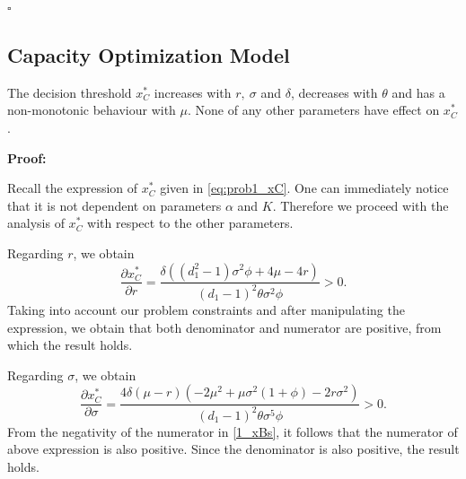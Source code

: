  
\begin{flushright}
 $\square$
\end{flushright}


\subsection{Capacity Optimization Model}

\begin{prop}
	\label{1_prop2}
The decision threshold $x^*_C$ increases with $r, \ \sigma$ and $\delta$, decreases with $\theta$ and has a non-monotonic behaviour with  $\mu$. None of any other parameters have effect on $x^*_C$.
\end{prop}

\textbf{Proof:}

Recall the expression of $x^*_C$ given in \eqref{eq:prob1_xC}. One can immediately notice that it is not dependent on parameters $\alpha$ and $K$. Therefore we proceed with the analysis of $x^*_C$ with respect to the other parameters.

Regarding $r$, we obtain
$$\frac{\partial x^*_C}{\partial r}=\frac{\delta  \left(\left(d_1^2-1\right) \sigma ^2  \phi+4 \mu -4 r\right)}{(d_1-1)^2 \theta  \sigma ^2 \phi}>0.$$
Taking into account our problem constraints and after manipulating the expression, we obtain that both denominator and numerator are positive, from which the result holds.


Regarding $\sigma$, we obtain
$$\frac{\partial x^*_C}{\partial \sigma}=\frac{4 \delta  (\mu -r) \left(-2 \mu ^2+\mu  \sigma ^2 (1+\phi)-2 r \sigma ^2\right)}{(d_1-1)^2 \theta  \sigma ^5 \phi}>0.$$
From the negativity of the numerator in  \eqref{1_xBs}, it follows that the numerator of above expression is also positive. Since the denominator is also positive, the result holds.

